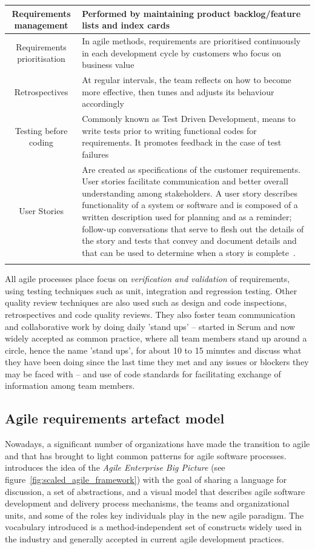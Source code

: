 \documentclass[dissertation,final]{softeng}
\begin{document}
\begin{table}[h!]
{\begin{tabularx}{\textwidth}{cX}
Requirements management &  Performed by maintaining
product backlog/feature lists and index cards\\ \midrule
Requirements prioritisation & In agile methods, requirements are prioritised continuously in each development cycle by customers who focus on business value\\ \midrule
Retrospectives & At regular intervals, the team reflects on how to become more effective, then tunes and adjusts its behaviour accordingly~\footnotemark\\ \midrule
Testing before coding & Commonly known as Test Driven Development, means to write tests prior to writing functional codes for requirements. It promotes feedback in the case of test failures\\ \midrule
User Stories & Are created as specifications of the customer requirements. User stories facilitate communication and better overall understanding among stakeholders. A user story describes functionality of a system or software and is composed of a written description used for planning and as a reminder; follow-up conversations that serve to flesh out the details of the story and tests that convey and document details and that can be used to determine when a story is complete~\citep{cohn2004user}.\\
\addlinespace
\bottomrule
\end{tabularx}
}
\end{table}

All agile processes place focus on \emph{verification and validation} of requirements, using testing techniques such as unit, integration and regression testing. Other quality review techniques are also used such as design and code inspections, retrospectives and code quality reviews. They also foster team communication and collaborative work by doing daily 'stand ups' -- started in Scrum and now widely accepted as common practice, where all team members stand up around a circle, hence the name 'stand ups', for about 10 to 15 minutes and discuss what they have been doing since the last time they met and any issues or blockers they may be faced with -- and use of code standards for facilitating exchange of information among team members.

\subsection{Agile requirements artefact model}
Nowadays, a significant number of organizations have made the transition to agile and that has brought to light common patterns for agile software processes. ~\citet{Leffingwell2011} introduces the idea of the \emph{Agile Enterprise Big Picture} (see figure~\ref{fig:scaled_agile_framework}) with the goal of sharing a language for discussion, a set of abstractions, and a visual model that describes agile software development and delivery process mechanisms, the teams and organizational units, and some of the roles key individuals play in the new agile paradigm. The vocabulary introduced is a method-independent set of constructs widely used in the industry and generally accepted in current agile development practices.
\end{document}
